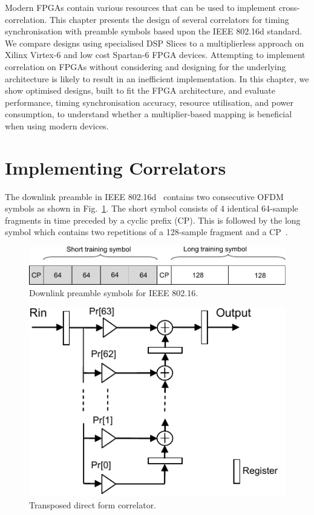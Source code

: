 Modern FPGAs contain various resources that can be used to implement cross-correlation.
This chapter presents the design of several correlators for timing synchronisation with preamble symbols based upon the IEEE 802.16d standard.
We compare designs using specialised DSP Slices to a multiplierless approach on Xilinx Virtex-6 and low cost Spartan-6 FPGA devices.
Attempting to implement correlation on FPGAs without considering and designing for the underlying architecture is likely to result in an inefficient implementation.
In this chapter, we show optimised designs, built to fit the FPGA architecture, and evaluate performance, timing synchronisation accuracy, resource utilisation, and power consumption, to understand whether a multiplier-based mapping is beneficial when using modern devices.
\section{Implementing Correlators}

The downlink preamble in IEEE 802.16d~\cite{IEEE80216} contains two consecutive OFDM symbols as shown in Fig.~\ref{fig:pre}.
The short symbol consists of 4 identical 64-sample fragments in time preceded by a cyclic prefix (CP).
This is followed by the long symbol which contains two repetitions of a 128-sample fragment and a CP~\cite{IEEE80216}.

\begin{figure}
	\centerline{\includegraphics [width=0.7\columnwidth] {figures/Preamble.pdf} }
	\caption{Downlink preamble symbols for IEEE 802.16.}
	\label{fig:pre}
\end{figure}

\begin{figure}
	\centerline{\includegraphics [width=0.4\columnwidth] {figures/structure_correlator.pdf} }
	\caption{Transposed direct form correlator.}
	\label{fig:str_corr}
\end{figure}


